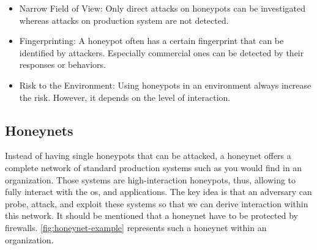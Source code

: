 \begin{itemize}
    \item Narrow Field of View: Only direct attacks on honeypots can be investigated whereas attacks on production system are not detected.
    \item Fingerprinting: A honeypot often has a certain fingerprint that can be identified by attackers.
          Especially commercial ones can be detected by their responses or behaviors.
    \item Risk to the Environment: Using honeypots in an environment always increase the risk.
          However, it depends on the level of interaction.
\end{itemize}

\subsection{Honeynets}

Instead of having single honeypots that can be attacked, a honeynet offers a complete network of standard production systems such as you would find in an organization.
Those systems are high-interaction honeypots, thus, allowing to fully interact with the \ac{os}, and applications.
The key idea is that an adversary can probe, attack, and exploit these systems so that we can derive interaction within this network.
It should be mentioned that a honeynet have to be protected by firewalls.
\autoref{fig:honeynet-example} represents such a honeynet within an organization.

